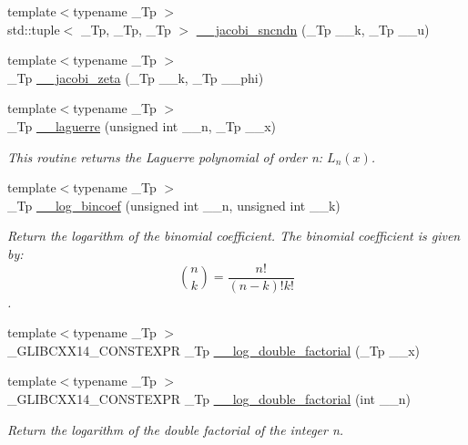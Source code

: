 \begin{DoxyCompactItemize}
{\footnotesize template$<$typename \+\_\+\+Tp $>$ }\\std\+::tuple$<$ \+\_\+\+Tp, \+\_\+\+Tp, \+\_\+\+Tp $>$ \hyperlink{namespacestd_1_1____detail_a98915d9bbc58112db7ffef2753313a63}{\+\_\+\+\_\+jacobi\+\_\+sncndn} (\+\_\+\+Tp \+\_\+\+\_\+k, \+\_\+\+Tp \+\_\+\+\_\+u)
\item 
{\footnotesize template$<$typename \+\_\+\+Tp $>$ }\\\+\_\+\+Tp \hyperlink{namespacestd_1_1____detail_a1d5fc69202703d72974c4370fd7ade03}{\+\_\+\+\_\+jacobi\+\_\+zeta} (\+\_\+\+Tp \+\_\+\+\_\+k, \+\_\+\+Tp \+\_\+\+\_\+phi)
\item 
{\footnotesize template$<$typename \+\_\+\+Tp $>$ }\\\+\_\+\+Tp \hyperlink{namespacestd_1_1____detail_aa714c4983a3cb7d9d18e0c2c5a8f6826}{\+\_\+\+\_\+laguerre} (unsigned int \+\_\+\+\_\+n, \+\_\+\+Tp \+\_\+\+\_\+x)
\begin{DoxyCompactList}\small\item\em This routine returns the Laguerre polynomial of order n\+: $ L_n(x) $. \end{DoxyCompactList}\item 
{\footnotesize template$<$typename \+\_\+\+Tp $>$ }\\\+\_\+\+Tp \hyperlink{namespacestd_1_1____detail_a152324942f37ae3c6fc65aec1f17049e}{\+\_\+\+\_\+log\+\_\+bincoef} (unsigned int \+\_\+\+\_\+n, unsigned int \+\_\+\+\_\+k)
\begin{DoxyCompactList}\small\item\em Return the logarithm of the binomial coefficient. The binomial coefficient is given by\+: \[ \binom{n}{k} = \frac{n!}{(n-k)! k!} \]. \end{DoxyCompactList}\item 
{\footnotesize template$<$typename \+\_\+\+Tp $>$ }\\\+\_\+\+G\+L\+I\+B\+C\+X\+X14\+\_\+\+C\+O\+N\+S\+T\+E\+X\+P\+R \+\_\+\+Tp \hyperlink{namespacestd_1_1____detail_a0de46e790512550b535bdda97e11e1b5}{\+\_\+\+\_\+log\+\_\+double\+\_\+factorial} (\+\_\+\+Tp \+\_\+\+\_\+x)
\item 
{\footnotesize template$<$typename \+\_\+\+Tp $>$ }\\\+\_\+\+G\+L\+I\+B\+C\+X\+X14\+\_\+\+C\+O\+N\+S\+T\+E\+X\+P\+R \+\_\+\+Tp \hyperlink{namespacestd_1_1____detail_aa832ed1d29fd41c40cf892cc1feef7e9}{\+\_\+\+\_\+log\+\_\+double\+\_\+factorial} (int \+\_\+\+\_\+n)
\begin{DoxyCompactList}\small\item\em Return the logarithm of the double factorial of the integer n. \end{DoxyCompactList}\item 

\end{DoxyCompactItemize}
